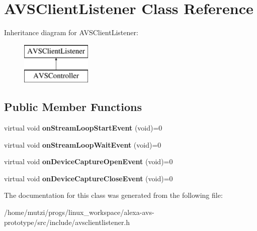 \hypertarget{classAVSClientListener}{}\section{A\+V\+S\+Client\+Listener Class Reference}
\label{classAVSClientListener}
Inheritance diagram for A\+V\+S\+Client\+Listener\+:\begin{figure}[H]
\begin{center}
\leavevmode
\includegraphics[height=2.000000cm]{d5/d2c/classAVSClientListener}
\end{center}
\end{figure}
\subsection*{Public Member Functions}
\begin{DoxyCompactItemize}
\item 
\mbox{\label{classAVSClientListener_a832446639c6b2f171a75a925badac576}} 
virtual void {\bfseries on\+Stream\+Loop\+Start\+Event} (void)=0
\item 
\mbox{\label{classAVSClientListener_aba46eb1768eb5abdfb01c7d3ef3768c9}} 
virtual void {\bfseries on\+Stream\+Loop\+Wait\+Event} (void)=0
\item 
\mbox{\label{classAVSClientListener_a2dda4af7731de612043954d1a9abcb18}} 
virtual void {\bfseries on\+Device\+Capture\+Open\+Event} (void)=0
\item 
\mbox{\label{classAVSClientListener_a12db20d06801d1af8fb77211a4a2eeb5}} 
virtual void {\bfseries on\+Device\+Capture\+Close\+Event} (void)=0
\end{DoxyCompactItemize}


The documentation for this class was generated from the following file\+:\begin{DoxyCompactItemize}
\item 
/home/mutzi/progs/linux\+\_\+workspace/alexa-\/avs-\/prototype/src/include/avsclientlistener.\+h\end{DoxyCompactItemize}
